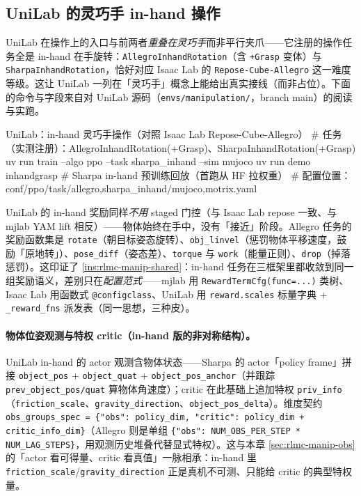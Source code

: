 \subsection{UniLab 的灵巧手 in-hand 操作}
\label{sec:rlmc-manip-unilabinhand}

UniLab 在操作上的入口与前两者\emph{重叠在灵巧手}而非平行夹爪——它注册的操作任务全是 in-hand 在手旋转：\verb|AllegroInhandRotation|（含 \verb|+Grasp| 变体）与 \verb|SharpaInhandRotation|，恰好对应 Isaac Lab 的 \verb|Repose-Cube-Allegro| 这一难度等级。这让 UniLab 一列在「灵巧手」概念上能给出真实接线（而非占位）。下面的命令与字段来自对 UniLab 源码（\verb|envs/manipulation/|，branch main）的阅读与实跑。

\begin{codebox}[bash]{UniLab：in-hand 灵巧手操作（对照 Isaac Lab Repose-Cube-Allegro）}
# 任务（实测注册）：AllegroInhandRotation(+Grasp)、SharpaInhandRotation(+Grasp)
uv run train --algo ppo --task sharpa_inhand --sim mujoco
uv run demo inhandgrasp            # Sharpa in-hand 预训练回放（首跑从 HF 拉权重）
# 配置位置：conf/ppo/task/{allegro,sharpa}_inhand/{mujoco,motrix}.yaml
\end{codebox}

UniLab 的 in-hand 奖励同样\emph{不用} staged 门控（与 Isaac Lab repose 一致、与 mjlab YAM lift 相反）——物体始终在手中，没有「接近」阶段。Allegro 任务的奖励函数集是 \verb|rotate|（朝目标姿态旋转）、\verb|obj_linvel|（惩罚物体平移速度，鼓励「原地转」）、\verb|pose_diff|（姿态差）、\verb|torque| 与 \verb|work|（能量正则）、\verb|drop|（掉落惩罚）。这印证了 \cref{ins:rlmc-manip-shared}：in-hand 任务在三框架里都收敛到同一组奖励语义，差别只在\emph{配置范式}——mjlab 用 \verb|RewardTermCfg(func=...)| 类树、Isaac Lab 用函数式 \verb|@configclass|、UniLab 用 \verb|reward.scales| 标量字典 + \verb|_reward_fns| 派发表（同一思想，三种皮）。

\paragraph{物体位姿观测与特权 critic（in-hand 版的非对称结构）。}UniLab in-hand 的 actor 观测含物体状态——Sharpa 的 actor「policy frame」拼接 \verb|object_pos| + \verb|object_quat| + \verb|object_pos_anchor|（并跟踪 \verb|prev_object_pos/quat| 算物体角速度）；critic 在此基础上追加特权 \verb|priv_info|（\verb|friction_scale|、\verb|gravity_direction|、\verb|object_pos_delta|）。维度契约 \verb|obs_groups_spec = {"obs": policy_dim, "critic": policy_dim + critic_info_dim}|（Allegro 则是单组 \verb|{"obs": NUM_OBS_PER_STEP * NUM_LAG_STEPS}|，用观测历史堆叠代替显式特权）。这与本章 \cref{sec:rlmc-manip-obs} 的「actor 看可得量、critic 看真值」一脉相承：in-hand 里 \verb|friction_scale|/\verb|gravity_direction| 正是真机不可测、只能给 critic 的典型特权量。

